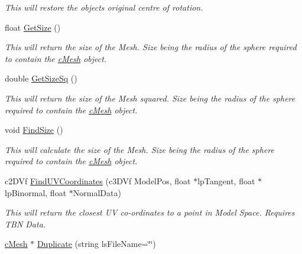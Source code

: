 \begin{DoxyCompactItemize}
\begin{DoxyCompactList}\small\item\em This will restore the objects original centre of rotation. \end{DoxyCompactList}\item 
\hypertarget{classc_mesh_a93bdde998cfebc274b7573444dc98d34}{
float \hyperlink{classc_mesh_a93bdde998cfebc274b7573444dc98d34}{GetSize} ()}
\label{classc_mesh_a93bdde998cfebc274b7573444dc98d34}

\begin{DoxyCompactList}\small\item\em This will return the size of the Mesh. Size being the radius of the sphere required to contain the \hyperlink{classc_mesh}{cMesh} object. \end{DoxyCompactList}\item 
\hypertarget{classc_mesh_a47b1bea169448ce42035a82115a6ac48}{
double \hyperlink{classc_mesh_a47b1bea169448ce42035a82115a6ac48}{GetSizeSq} ()}
\label{classc_mesh_a47b1bea169448ce42035a82115a6ac48}

\begin{DoxyCompactList}\small\item\em This will return the size of the Mesh squared. Size being the radius of the sphere required to contain the \hyperlink{classc_mesh}{cMesh} object. \end{DoxyCompactList}\item 
\hypertarget{classc_mesh_abaa10891ab82ca5988bb255fda7cfdae}{
void \hyperlink{classc_mesh_abaa10891ab82ca5988bb255fda7cfdae}{FindSize} ()}
\label{classc_mesh_abaa10891ab82ca5988bb255fda7cfdae}

\begin{DoxyCompactList}\small\item\em This will calculate the size of the Mesh. Size being the radius of the sphere required to contain the \hyperlink{classc_mesh}{cMesh} object. \end{DoxyCompactList}\item 
\hypertarget{classc_mesh_ad3532e19ca542f90797df565b10c2be5}{
c2DVf \hyperlink{classc_mesh_ad3532e19ca542f90797df565b10c2be5}{FindUVCoordinates} (c3DVf ModelPos, float $\ast$lpTangent, float $\ast$lpBinormal, float $\ast$NormalData)}
\label{classc_mesh_ad3532e19ca542f90797df565b10c2be5}

\begin{DoxyCompactList}\small\item\em This will return the closest UV co-\/ordinates to a point in Model Space. Requires TBN Data. \end{DoxyCompactList}\item 
\hypertarget{classc_mesh_a325c1397e0594d3b19b11e4f789f93ca}{
\hyperlink{classc_mesh}{cMesh} $\ast$ \hyperlink{classc_mesh_a325c1397e0594d3b19b11e4f789f93ca}{Duplicate} (string lsFileName=\char`\"{}\char`\"{})}
\label{classc_mesh_a325c1397e0594d3b19b11e4f789f93ca}


\end{DoxyCompactItemize}
